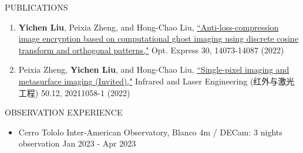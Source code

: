 \documentclass[11pt]{article}
\begin{document}
\newpage

\begin{section}{PUBLICATIONS}
    
\begin{enumerate}[leftmargin=1.5em]
    \item  \textbf{Yichen Liu}, Peixia Zheng, and Hong-Chao Liu, \href{https://opg.optica.org/oe/fulltext.cfm?uri=oe-30-9-14073&id=471300}{``Anti-loss-compression image encryption based on computational ghost imaging using discrete cosine transform and orthogonal patterns,"} Opt. Express 30, 14073-14087 (2022)
    \item Peixia Zheng, \textbf{Yichen Liu}, and Hong-Chao Liu, \href{http://www.irla.cn/cn/article/doi/10.3788/IRLA20211058}{``Single-pixel imaging and metasurface imaging (Invited),"} Infrared and Laser Engineering (红外与激光工程) 50.12, 20211058-1 (2022)
\end{enumerate}

\end{section}


\begin{section}{OBSERVATION EXPERIENCE}
    
    \begin{itemize}[leftmargin=1.5em]
        \item Cerro Tololo Inter-American Observatory, Blanco 4m / DECam: 3 nights observation \hfill Jan 2023 - Apr 2023
    \end{itemize}

\end{section}
\end{document}
